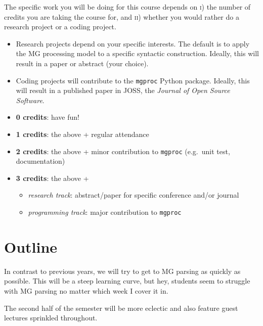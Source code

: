 The specific work you will be doing for this course depends on \textsc{i}) the number of credits you are taking the course for, and \textsc{ii}) whether you would rather do a research project or a coding project.

\begin{itemize}
    \item Research projects depend on your specific interests.
          The default is to apply the MG processing model to a specific syntactic construction.
          Ideally, this will result in a paper or abstract (your choice).
    \item Coding projects will contribute to the \texttt{mgproc} Python package.
          Ideally, this will result in a published paper in JOSS, the \emph{Journal of Open Source Software}.
\end{itemize}

\begin{itemize}
    \item \textbf{0 credits}: have fun!
    \item \textbf{1 credits}: the above + regular attendance
    \item \textbf{2 credits}: the above + minor contribution to \texttt{mgproc} (e.g.~unit test, documentation)
    \item \textbf{3 credits}: the above +
        \begin{itemize}
            \item \emph{research track}: abstract/paper for specific conference and/or journal
            \item \emph{programming track}: major contribution to \texttt{mgproc}
        \end{itemize}
\end{itemize}


\section{Outline}

In contrast to previous years, we will try to get to MG parsing as quickly as possible.
This will be a steep learning curve, but hey, students seem to struggle with MG parsing no matter which week I cover it in.

The second half of the semester will be more eclectic and also feature guest lectures sprinkled throughout.

